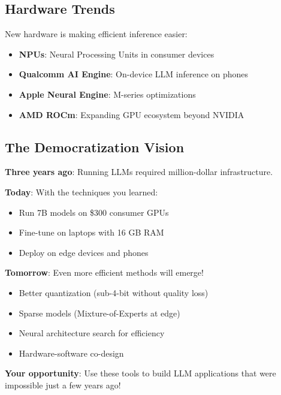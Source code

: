 \documentclass{article}
\begin{document}
\subsection{Hardware Trends}

New hardware is making efficient inference easier:

\begin{itemize}
\item \textbf{NPUs}: Neural Processing Units in consumer devices
\item \textbf{Qualcomm AI Engine}: On-device LLM inference on phones
\item \textbf{Apple Neural Engine}: M-series optimizations
\item \textbf{AMD ROCm}: Expanding GPU ecosystem beyond NVIDIA
\end{itemize}

\subsection{The Democratization Vision}

\begin{tcolorbox}[colback=blue!5!white, colframe=blue!50!black, title=The Future is Accessible]
\textbf{Three years ago}: Running LLMs required million-dollar infrastructure.

\textbf{Today}: With the techniques you learned:
\begin{itemize}
\item Run 7B models on \$300 consumer GPUs
\item Fine-tune on laptops with 16 GB RAM
\item Deploy on edge devices and phones
\end{itemize}

\textbf{Tomorrow}: Even more efficient methods will emerge!
\begin{itemize}
\item Better quantization (sub-4-bit without quality loss)
\item Sparse models (Mixture-of-Experts at edge)
\item Neural architecture search for efficiency
\item Hardware-software co-design
\end{itemize}

\textbf{Your opportunity}: Use these tools to build LLM applications that were impossible just a few years ago!
\end{tcolorbox}
\end{document}
